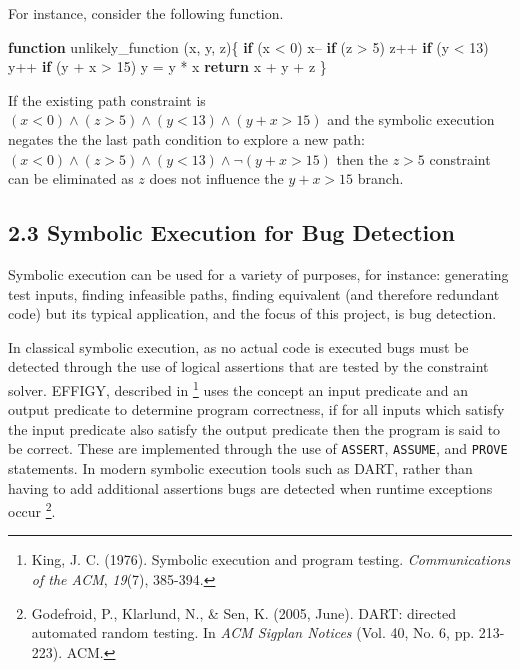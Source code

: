\documentclass[]{article}
\newenvironment{Shaded}{}{}
\newcommand{\AttributeTok}[1]{\textcolor[rgb]{0.49,0.56,0.16}{#1}}
\newcommand{\ControlFlowTok}[1]{\textcolor[rgb]{0.00,0.44,0.13}{\textbf{#1}}}
\newcommand{\DecValTok}[1]{\textcolor[rgb]{0.25,0.63,0.44}{#1}}
\newcommand{\KeywordTok}[1]{\textcolor[rgb]{0.00,0.44,0.13}{\textbf{#1}}}
\newcommand{\NormalTok}[1]{#1}
\newcommand{\OperatorTok}[1]{\textcolor[rgb]{0.40,0.40,0.40}{#1}}
\begin{document}
For instance, consider the following function.

\begin{Shaded}
\begin{Highlighting}[]
\KeywordTok{function} \AttributeTok{unlikely_function}\NormalTok{ (x}\OperatorTok{,}\NormalTok{ y}\OperatorTok{,}\NormalTok{ z)}\OperatorTok{\{}
 \ControlFlowTok{if}\NormalTok{ (x }\OperatorTok{<} \DecValTok{0}\NormalTok{)}
\NormalTok{   x}\OperatorTok{--}
 \ControlFlowTok{if}\NormalTok{ (z }\OperatorTok{>} \DecValTok{5}\NormalTok{)}
\NormalTok{   z}\OperatorTok{++}
 \ControlFlowTok{if}\NormalTok{ (y }\OperatorTok{<} \DecValTok{13}\NormalTok{)}
\NormalTok{   y}\OperatorTok{++}
 \ControlFlowTok{if}\NormalTok{ (y }\OperatorTok{+}\NormalTok{ x }\OperatorTok{>} \DecValTok{15}\NormalTok{)}
\NormalTok{   y }\OperatorTok{=}\NormalTok{ y }\OperatorTok{*}\NormalTok{ x}
 \ControlFlowTok{return}\NormalTok{ x }\OperatorTok{+}\NormalTok{ y }\OperatorTok{+}\NormalTok{ z}
\OperatorTok{\}}
\end{Highlighting}
\end{Shaded}

If the existing path constraint is
\((x < 0 ) \land ( z  > 5) \land (y < 13) \land (y + x > 15) \) and the
symbolic execution negates the the last path condition to explore a new
path: \( (x < 0) \land (z > 5) \land (y < 13) \land \lnot(y + x > 15)\)
then the \(z > 5\) constraint can be eliminated as \(z\) does not
influence the \(y + x > 15\) branch.

\hypertarget{header-n103}{%
\subsection{2.3 Symbolic Execution for Bug
Detection}\label{header-n103}}

Symbolic execution can be used for a variety of purposes, for instance:
generating test inputs, finding infeasible paths, finding equivalent
(and therefore redundant code) but its typical application, and the
focus of this project, is bug detection.

In classical symbolic execution, as no actual code is executed bugs must
be detected through the use of logical assertions that are tested by the
constraint solver. EFFIGY, described in \footnote{King, J. C. (1976).
  Symbolic execution and program testing. \emph{Communications of the
  ACM}, \emph{19}(7), 385-394.} uses the concept an input predicate and
an output predicate to determine program correctness, if for all inputs
which satisfy the input predicate also satisfy the output predicate then
the program is said to be correct. These are implemented through the use
of \texttt{ASSERT}, \texttt{ASSUME}, and \texttt{PROVE} statements. In
modern symbolic execution tools such as DART, rather than having to add
additional assertions bugs are detected when runtime exceptions occur
\footnote{Godefroid, P., Klarlund, N., \& Sen, K. (2005, June). DART:
  directed automated random testing. In \emph{ACM Sigplan Notices} (Vol.
  40, No. 6, pp. 213-223). ACM.}.
\end{document}
